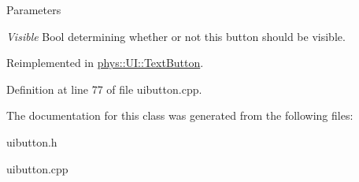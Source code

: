 \begin{DoxyParams}{Parameters}
\item[{\em Visible}]Bool determining whether or not this button should be visible. \end{DoxyParams}


Reimplemented in \hyperlink{classphys_1_1UI_1_1TextButton_a07e030ef92f314b1eff663cbc1712d42}{phys::UI::TextButton}.



Definition at line 77 of file uibutton.cpp.



The documentation for this class was generated from the following files:\begin{DoxyCompactItemize}
\item 
uibutton.h\item 
uibutton.cpp\end{DoxyCompactItemize}
